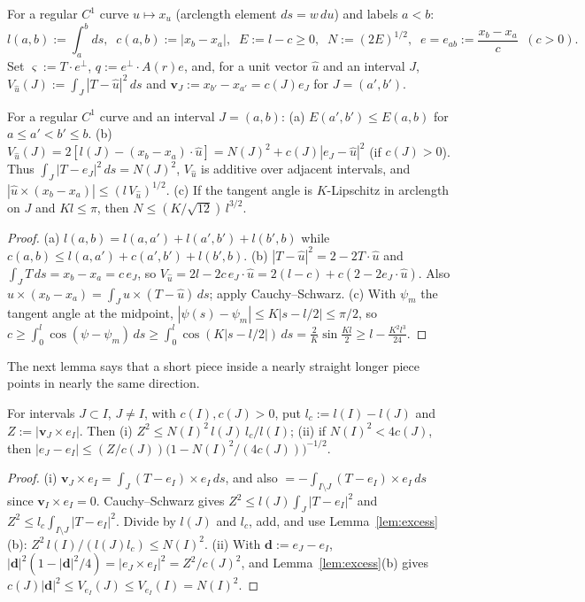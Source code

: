 \begin{definition}\label{def:twopt}
For a regular $C^1$ curve $u\mapsto x_u$ (arclength element $ds=w\,du$) and labels $a<b$:
\[
l(a,b):=\int_a^bds,\;\; c(a,b):=|x_b-x_a|,\;\; E:=l-c\ge0,\;\; N:=(2E)^{1/2},\;\; e=e_{ab}:=\frac{x_b-x_a}{c}\;\;(c>0).
\]
Set $\varsigma:=T\cdot e^\perp$, $q:=e^\perp\cdot A(r)e$, and, for a unit vector $\hat u$ and an interval $J$,
$V_{\hat u}(J):=\int_J|T-\hat u|^2\,ds$ and $\mathbf v_J:=x_{b'}-x_{a'}=c(J)e_J$ for $J=(a',b')$.
\end{definition}

\begin{lemma}\label{lem:excess}
For a regular $C^1$ curve and an interval $J=(a,b)$:
\textup{(a)} $E(a',b')\le E(a,b)$ for $a\le a'<b'\le b$.
\textup{(b)} $V_{\hat u}(J)=2[l(J)-(x_b-x_a)\cdot\hat u]=N(J)^2+c(J)|e_J-\hat u|^2$ \textup(if $c(J)>0$\textup). Thus
$\int_J|T-e_J|^2\,ds=N(J)^2$, $V_{\hat u}$ is additive over adjacent intervals, and
$|\hat u\times(x_b-x_a)|\le(l\,V_{\hat u})^{1/2}$.
\textup{(c)} If the tangent angle is $K$-Lipschitz in arclength on $J$ and $Kl\le\pi$, then $N\le(K/\sqrt{12})\,l^{3/2}$.
\end{lemma}

\begin{proof}
(a) $l(a,b)=l(a,a')+l(a',b')+l(b',b)$ while $c(a,b)\le l(a,a')+c(a',b')+l(b',b)$. (b) $|T-\hat u|^2=2-2T\cdot\hat u$ and
$\int_JT\,ds=x_b-x_a=c\,e_J$, so $V_{\hat u}=2l-2c\,e_J\cdot\hat u=2(l-c)+c(2-2e_J\cdot\hat u)$. Also
$\hat u\times(x_b-x_a)=\int_J\hat u\times(T-\hat u)\,ds$; apply Cauchy--Schwarz. (c) With $\psi_m$ the tangent angle at
the midpoint, $|\psi(s)-\psi_m|\le K|s-l/2|\le\pi/2$, so
$c\ge\int_0^l\cos(\psi-\psi_m)\,ds\ge\int_0^l\cos(K|s-l/2|)\,ds=\frac2K\sin\frac{Kl}2\ge l-\frac{K^2l^3}{24}$.
\end{proof}

The next lemma says that a short piece inside a nearly straight longer piece points in nearly the same direction.

\begin{lemma}\label{lem:splittilt}
For intervals $J\subset I$, $J\ne I$, with $c(I),c(J)>0$, put $l_c:=l(I)-l(J)$ and $Z:=|\mathbf v_J\times e_I|$. Then
\textup{(i)} $Z^2\le N(I)^2\,l(J)\,l_c/l(I)$;
\textup{(ii)} if $N(I)^2<4c(J)$, then $|e_J-e_I|\le(Z/c(J))\bigl(1-N(I)^2/(4c(J))\bigr)^{-1/2}$.
\end{lemma}

\begin{proof}
(i) $\mathbf v_J\times e_I=\int_J(T-e_I)\times e_I\,ds$, and also $=-\int_{I\setminus J}(T-e_I)\times e_I\,ds$ since
$\mathbf v_I\times e_I=0$. Cauchy--Schwarz gives $Z^2\le l(J)\int_J|T-e_I|^2$ and $Z^2\le l_c\int_{I\setminus J}|T-e_I|^2$.
Divide by $l(J)$ and $l_c$, add, and use Lemma~\ref{lem:excess}(b): $Z^2\,l(I)/(l(J)l_c)\le N(I)^2$.
(ii) With $\mathbf d:=e_J-e_I$, $|\mathbf d|^2(1-|\mathbf d|^2/4)=|e_J\times e_I|^2=Z^2/c(J)^2$, and
Lemma~\ref{lem:excess}(b) gives $c(J)|\mathbf d|^2\le V_{e_I}(J)\le V_{e_I}(I)=N(I)^2$.
\end{proof}

